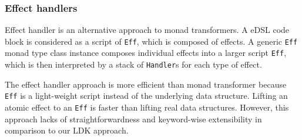 \subsubsection{Effect handlers}\label{Effect handlers}

Effect handler \cite{kiselyov2013extensible} is an alternative approach to monad transformers. A eDSL code block is considered as a script of \lstinline{Eff}, which is composed of effects. A generic \lstinline{Eff} monad type class instance composes individual effects into a larger script \lstinline{Eff}, which is then interpreted by a stack of \lstinline{Handler}s for each type of effect.

The effect handler approach is more efficient than monad transformer because \lstinline{Eff} is a light-weight script instead of the underlying data structure. Lifting an atomic effect to an \lstinline{Eff} is faster than lifting real data structures. However, this approach lacks of straightforwardness and keyword-wise extensibility in comparison to our LDK approach.

